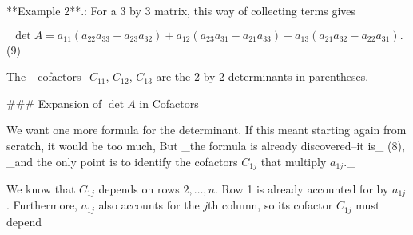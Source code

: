 **Example 2**.: For a 3 by 3 matrix, this way of collecting terms gives

\[\det A=a_{11}(a_{22}a_{33}-a_{23}a_{32})+a_{12}(a_{23}a_{31}-a_{21}a_{33})+a_ {13}(a_{21}a_{32}-a_{22}a_{31}).\] (9)

The _cofactors_\(C_{11}\), \(C_{12}\), \(C_{13}\) are the 2 by 2 determinants in parentheses.

### Expansion of \(\det A\) in Cofactors

We want one more formula for the determinant. If this meant starting again from scratch, it would be too much, But _the formula is already discovered--it is_ (8), _and the only point is to identify the cofactors \(C_{1j}\) that multiply \(a_{1j}\)._

We know that \(C_{1j}\) depends on rows \(2,\ldots,n\). Row 1 is already accounted for by \(a_{1j}\). Furthermore, \(a_{1j}\) also accounts for the \(j\)th column, so its cofactor \(C_{1j}\) must depend 
